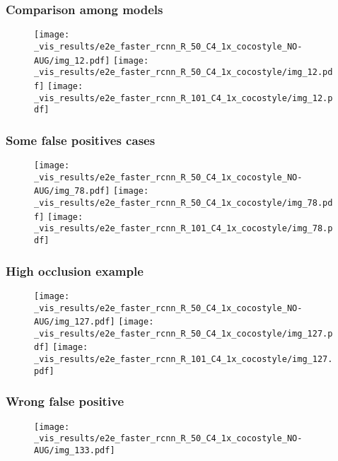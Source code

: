 \documentclass{beamer}
\begin{document}
		\begin{frame}\frametitle{Comparison among models}
			\begin{figure}[htb!]
				\centering
				\texttt{[image: \_vis\_results/e2e\_faster\_rcnn\_R\_50\_C4\_1x\_cocostyle\_NO-AUG/img\_12.pdf]}
				\texttt{[image: \_vis\_results/e2e\_faster\_rcnn\_R\_50\_C4\_1x\_cocostyle/img\_12.pdf]}
				\vspace{3mm}
				\texttt{[image: \_vis\_results/e2e\_faster\_rcnn\_R\_101\_C4\_1x\_cocostyle/img\_12.pdf]}
  			\label{fig:improv_2}
			\end{figure}
		\end{frame}


		\begin{frame}\frametitle{Some false positives cases}
			\begin{figure}[htb!]
				\centering
				\texttt{[image: \_vis\_results/e2e\_faster\_rcnn\_R\_50\_C4\_1x\_cocostyle\_NO-AUG/img\_78.pdf]}
				\texttt{[image: \_vis\_results/e2e\_faster\_rcnn\_R\_50\_C4\_1x\_cocostyle/img\_78.pdf]}
				\vspace{.1mm}
				\texttt{[image: \_vis\_results/e2e\_faster\_rcnn\_R\_101\_C4\_1x\_cocostyle/img\_78.pdf]}
				\label{fig:FP_cases}
			\end{figure}
		\end{frame}


		\begin{frame}\frametitle{High occlusion example}
			\begin{figure}[htb!]
				\centering
				\texttt{[image: \_vis\_results/e2e\_faster\_rcnn\_R\_50\_C4\_1x\_cocostyle\_NO-AUG/img\_127.pdf]}
				\texttt{[image: \_vis\_results/e2e\_faster\_rcnn\_R\_50\_C4\_1x\_cocostyle/img\_127.pdf]}
				\vspace{.1mm}
				\texttt{[image: \_vis\_results/e2e\_faster\_rcnn\_R\_101\_C4\_1x\_cocostyle/img\_127.pdf]}
  			\label{fig:occlusion}
			\end{figure}
		\end{frame}


		\begin{frame}\frametitle{Wrong false positive}
			\begin{figure}[h!]
				\centering
				\texttt{[image: \_vis\_results/e2e\_faster\_rcnn\_R\_50\_C4\_1x\_cocostyle\_NO-AUG/img\_133.pdf]}
				\label{fig:wrong_fp}
			\end{figure}
		\end{frame}
\end{document}
